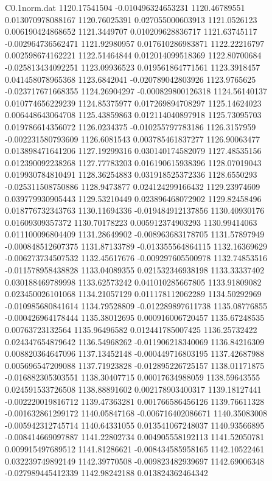 \begin{filecontents}{C0.1norm.dat}
1120.17541504		-0.010496324653231
1120.46789551		0.013070978088167
1120.76025391		0.027055000603913
1121.0526123		0.006190424868652
1121.3449707		0.010209628836717
1121.63745117		-0.002964736562471
1121.92980957		0.017610286983871
1122.22216797		0.002598674162221
1122.51464844		0.012014099518369
1122.80700684		-0.025813434092251
1123.09936523		0.019561864771561
1123.3918457		0.041458078965368
1123.6842041		-0.020789042803926
1123.9765625		-0.023717671668355
1124.26904297		-0.000829800126318
1124.56140137		0.010774656229239
1124.85375977		0.017269894708297
1125.14624023		0.006448643064708
1125.43859863		0.012114040897918
1125.73095703		0.019786614356072
1126.0234375		-0.010255797783186
1126.3157959		-0.002231580793609
1126.6081543		0.003785461837277
1126.90063477		0.013898471641206
1127.19299316		0.030140174582079
1127.48535156		0.012390092238268
1127.77783203		0.016190615938396
1128.07019043		0.019930784810491
1128.36254883		0.031918525372336
1128.6550293		-0.025311508750886
1128.9473877		0.024124299166432
1129.23974609		0.039779930905443
1129.53210449		0.023896468072902
1129.82458496		0.018776732343763
1130.11694336		-0.019484912137856
1130.40930176		0.01609309357372
1130.70178223		0.005912374903293
1130.99414063		0.011100096804409
1131.28649902		-0.008963683178705
1131.57897949		-0.000848512607375
1131.87133789		-0.013355564864115
1132.16369629		-0.006273734507532
1132.45617676		-0.009297605500978
1132.74853516		-0.011578958438828
1133.04089355		0.021532346938198
1133.33337402		0.030188469789998
1133.62573242		0.041010285667805
1133.91809082		0.023450026101068
1134.21057129		0.011178112062289
1134.50292969		-0.010985680841614
1134.79528809		-0.012289897611738
1135.08776855		-0.000426964178444
1135.38012695		0.000916006720457
1135.67248535		0.00763723132564
1135.96496582		0.012441785007425
1136.25732422		0.024347654879642
1136.54968262		-0.011906218340069
1136.84216309		0.008820364647096
1137.13452148		-0.000449716803195
1137.42687988		0.005696547209088
1137.71923828		-0.012895226725157
1138.01171875		-0.016882305303551
1138.30407715		0.00017634988059
1138.59643555		0.024591533726508
1138.88891602		0.002178903400317
1139.18127441		-0.002220019816712
1139.47363281		0.001766586456126
1139.76611328		-0.001632861299172
1140.05847168		-0.006716402086671
1140.35083008		-0.005942312745714
1140.64331055		0.013541067248037
1140.93566895		-0.008414669097887
1141.22802734		0.004905558192113
1141.52050781		0.009915497689512
1141.81286621		-0.008434585958165
1142.10522461		0.032239749892149
1142.39770508		-0.009823482939697
1142.69006348		-0.027989445412339
1142.98242188		0.013824362464342

\end{filecontents}
